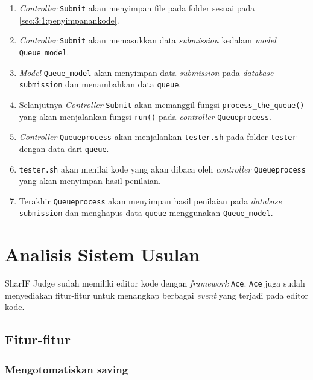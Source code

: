 \begin{enumerate}
      \item \textit{Controller} \verb|Submit| akan menyimpan file pada folder sesuai pada \ref{sec:3:1:penyimpanankode}.
      \item \textit{Controller} \verb|Submit| akan memasukkan data \textit{submission} kedalam \textit{model} \verb|Queue_model|.
      \item \textit{Model} \verb|Queue_model| akan menyimpan data \textit{submission} pada \textit{database} \verb|submission| dan menambahkan data \verb|queue|.
      \item Selanjutnya \textit{Controller} \verb|Submit| akan memanggil fungsi \verb|process_the_queue()| yang akan menjalankan fungsi \verb|run()| pada \textit{controller} \verb|Queueprocess|.
      \item \textit{Controller} \verb|Queueprocess| akan menjalankan \verb|tester.sh| pada folder \verb|tester| dengan data dari \verb|queue|.
      \item \verb|tester.sh| akan menilai kode yang akan dibaca oleh \textit{controller} \verb|Queueprocess| yang akan menyimpan hasil penilaian.
      \item Terakhir \verb|Queueprocess| akan menyimpan hasil penilaian pada \textit{database} \verb|submission| dan menghapus data \verb|queue| menggunakan \verb|Queue_model|.
\end{enumerate}


\section{Analisis Sistem Usulan}
\label{sec:3:sistemusulan}

SharIF Judge sudah memiliki editor kode dengan \textit{framework} \verb|Ace|. \verb|Ace| juga sudah menyediakan fitur-fitur untuk menangkap berbagai \textit{event} yang terjadi pada editor kode.

\subsection{Fitur-fitur}
\label{sec:3:2:fitur}

\subsubsection{Mengotomatiskan saving}
\label{sec:3:2:1:autosave}

